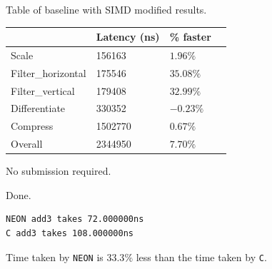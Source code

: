 \documentclass[
  course = {{ESE532 System-on-a-Chip}},
  quartile = {{}},
  assignment = 4,
  name = {{Sheil Sarda, Kate Ballard}},
  studentnumber = {{}},
  email = {{sheils@seas.upenn.edu, kballard@seas.upenn.edu}},
  firstexercise = 1
]{aga-homework}
\begin{document}
\subexercise Table of baseline with SIMD modified results.
\begin{table}[h]
	\centering
	\begin{tabular}{|l|l|l|l|}
		\hline
		& Latency (ns) & \% faster \\ \hline
		Scale & 156163  & $1.96\%$ \\ \hline
		Filter\_horizontal & 175546 & $35.08\%$ \\ \hline
		Filter\_vertical & 179408& $32.99\%$  \\ \hline
		Differentiate & 330352 & $-0.23\%$  \\ \hline
		Compress & 1502770 & $0.67\%$  \\ \hline
		Overall & 2344950 & $7.70\%$  \\ \hline
	\end{tabular}
\end{table}

\exercise

\subexercise
No submission required.

\subexercise
Done.

\subexercise
\begin{verbatim}
NEON add3 takes 72.000000ns 
C add3 takes 108.000000ns 
\end{verbatim}
Time taken by \verb|NEON| is $33.3\%$ less than the time taken by \verb|C|.
\end{document}

